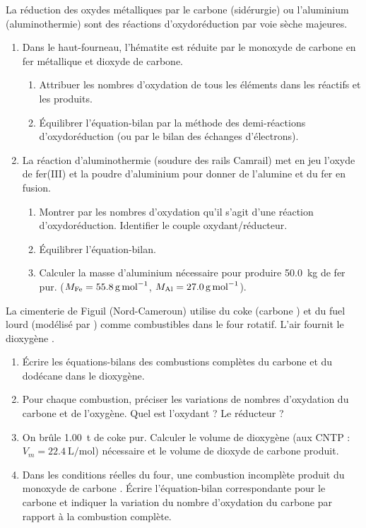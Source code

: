 \documentclass[11pt]{article}
\begin{document}
\begin{exercice}
La réduction des oxydes métalliques par le carbone (sidérurgie) ou l'aluminium (aluminothermie) sont des réactions d'oxydoréduction par voie sèche majeures.
\begin{enumerate}
    \item Dans le haut-fourneau, l'hématite  est réduite par le monoxyde de carbone  en fer métallique et dioxyde de carbone. 
    \begin{enumerate}
        \item Attribuer les nombres d'oxydation de tous les éléments dans les réactifs et les produits.
        \item Équilibrer l'équation-bilan par la méthode des demi-réactions d'oxydoréduction (ou par le bilan des échanges d'électrons).
    \end{enumerate}
    \item La réaction d'aluminothermie (soudure des rails Camrail) met en jeu l'oxyde de fer(III)  et la poudre d'aluminium  pour donner de l'alumine  et du fer en fusion.
    \begin{enumerate}
        \item Montrer par les nombres d'oxydation qu'il s'agit d'une réaction d'oxydoréduction. Identifier le couple oxydant/réducteur.
        \item Équilibrer l'équation-bilan.
        \item Calculer la masse d'aluminium nécessaire pour produire \SI{50,0}{\kilo\gram} de fer pur. ($M_{\ce{Fe}}=\SI{55,8}{\gram\per\mole}$, $M_{\ce{Al}}=\SI{27,0}{\gram\per\mole}$).
    \end{enumerate}
\end{enumerate}
\end{exercice}

\begin{exercice}
La cimenterie de Figuil (Nord-Cameroun) utilise du coke (carbone ) et du fuel lourd (modélisé par ) comme combustibles dans le four rotatif. L'air fournit le dioxygène .
\begin{enumerate}
    \item Écrire les équations-bilans des combustions complètes du carbone et du dodécane  dans le dioxygène.
    \item Pour chaque combustion, préciser les variations de nombres d'oxydation du carbone et de l'oxygène. Quel est l'oxydant ? Le réducteur ?
    \item On brûle \SI{1,00}{\tonne} de coke pur. Calculer le volume de dioxygène (aux CNTP : $V_m = \SI{22,4}{\liter\per\mole}$) nécessaire et le volume de dioxyde de carbone produit.
    \item Dans les conditions réelles du four, une combustion incomplète produit du monoxyde de carbone . Écrire l'équation-bilan correspondante pour le carbone et indiquer la variation du nombre d'oxydation du carbone par rapport à la combustion complète.
\end{enumerate}
\end{exercice}
\end{document}
